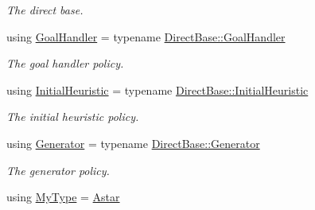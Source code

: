 \begin{DoxyCompactItemize}
\begin{DoxyCompactList}\small\item\em The direct base. \end{DoxyCompactList}\item 
using \hyperlink{structslb_1_1ext_1_1algorithm_1_1Astar_a44bf47362f5c203a2a637c986da15f47}{Goal\+Handler} = typename \hyperlink{structslb_1_1ext_1_1algorithm_1_1Algorithm_ae0c6a75028107e4642e43798f21f4bfc}{Direct\+Base\+::\+Goal\+Handler}\hypertarget{structslb_1_1ext_1_1algorithm_1_1Astar_a44bf47362f5c203a2a637c986da15f47}{}\label{structslb_1_1ext_1_1algorithm_1_1Astar_a44bf47362f5c203a2a637c986da15f47}

\begin{DoxyCompactList}\small\item\em The goal handler policy. \end{DoxyCompactList}\item 
using \hyperlink{structslb_1_1ext_1_1algorithm_1_1Astar_a0d23cb786a79d57e4319e62bc6427d16}{Initial\+Heuristic} = typename \hyperlink{structslb_1_1ext_1_1algorithm_1_1Algorithm_ad1f8f28e7b07f747ef7b7b5bf0643c2d}{Direct\+Base\+::\+Initial\+Heuristic}\hypertarget{structslb_1_1ext_1_1algorithm_1_1Astar_a0d23cb786a79d57e4319e62bc6427d16}{}\label{structslb_1_1ext_1_1algorithm_1_1Astar_a0d23cb786a79d57e4319e62bc6427d16}

\begin{DoxyCompactList}\small\item\em The initial heuristic policy. \end{DoxyCompactList}\item 
using \hyperlink{structslb_1_1ext_1_1algorithm_1_1Astar_a8e7c4ac827051423153a315c7b404119}{Generator} = typename \hyperlink{structslb_1_1ext_1_1algorithm_1_1Algorithm_afa5a78c048b4fe4f5848aeaf5c1f8d65}{Direct\+Base\+::\+Generator}\hypertarget{structslb_1_1ext_1_1algorithm_1_1Astar_a8e7c4ac827051423153a315c7b404119}{}\label{structslb_1_1ext_1_1algorithm_1_1Astar_a8e7c4ac827051423153a315c7b404119}

\begin{DoxyCompactList}\small\item\em The generator policy. \end{DoxyCompactList}\item 
using \hyperlink{structslb_1_1ext_1_1algorithm_1_1Astar_a49c5252e4f03e05f60409d22beaf4c8e}{My\+Type} = \hyperlink{structslb_1_1ext_1_1algorithm_1_1Astar}{Astar}\hypertarget{structslb_1_1ext_1_1algorithm_1_1Astar_a49c5252e4f03e05f60409d22beaf4c8e}{}\label{structslb_1_1ext_1_1algorithm_1_1Astar_a49c5252e4f03e05f60409d22beaf4c8e}


\end{DoxyCompactItemize}
